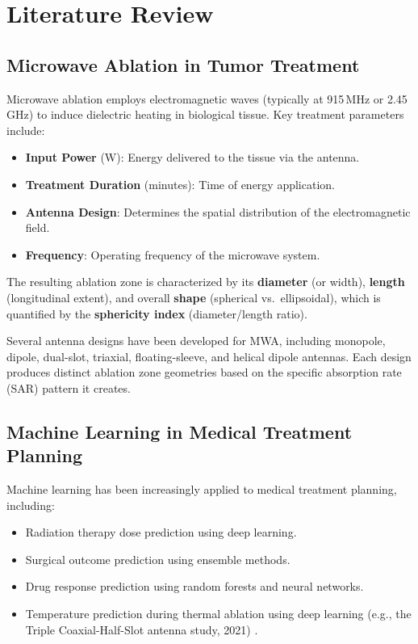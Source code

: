 \chapter{Literature Review}

\section{Microwave Ablation in Tumor Treatment}

Microwave ablation employs electromagnetic waves (typically at 915\,MHz or 2.45\,GHz) to induce dielectric heating in biological tissue. Key treatment parameters include:

\begin{itemize}
    \item \textbf{Input Power} (W): Energy delivered to the tissue via the antenna.
    \item \textbf{Treatment Duration} (minutes): Time of energy application.
    \item \textbf{Antenna Design}: Determines the spatial distribution of the electromagnetic field.
    \item \textbf{Frequency}: Operating frequency of the microwave system.
\end{itemize}

The resulting ablation zone is characterized by its \textbf{diameter} (or width), \textbf{length} (longitudinal extent), and overall \textbf{shape} (spherical vs.\ ellipsoidal), which is quantified by the \textbf{sphericity index} (diameter/length ratio).

Several antenna designs have been developed for MWA, including monopole, dipole, dual-slot, triaxial, floating-sleeve, and helical dipole antennas. Each design produces distinct ablation zone geometries based on the specific absorption rate (SAR) pattern it creates.


\section{Machine Learning in Medical Treatment Planning}

Machine learning has been increasingly applied to medical treatment planning, including:

\begin{itemize}
    \item Radiation therapy dose prediction using deep learning.
    \item Surgical outcome prediction using ensemble methods.
    \item Drug response prediction using random forests and neural networks.
    \item Temperature prediction during thermal ablation using deep learning (e.g., the Triple Coaxial-Half-Slot antenna study, 2021) \cite{triple_coaxial_2021}.
\end{itemize}

